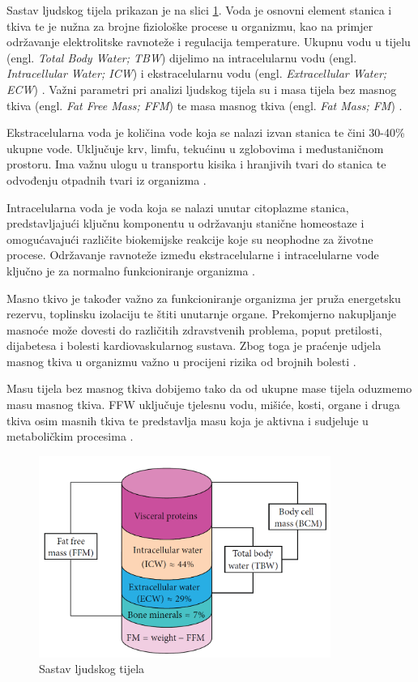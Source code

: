 \documentclass[../diplomski_rad.tex]{subfiles}
\begin{document}
Sastav ljudskog tijela prikazan je na slici \ref{slk:sastav_tijela}.
Voda je osnovni element stanica i tkiva te je nužna za brojne fiziološke procese u organizmu, 
kao na primjer održavanje elektrolitske ravnoteže i regulacija temperature.
Ukupnu vodu u tijelu (engl. \textit{Total Body Water; TBW}) 
dijelimo na intracelularnu vodu (engl. \textit{Intracellular Water; ICW}) i ekstracelularnu vodu (engl. \textit{Extracellular Water; ECW}) \cite{Bera2014}. 
Važni parametri pri analizi ljudskog tijela su i masa tijela bez masnog tkiva (engl. \textit{Fat Free Mass; FFM}) 
te masa masnog tkiva (engl. \textit{Fat Mass; FM}) \cite{Bera2014}.

Ekstracelularna voda je količina vode koja se nalazi izvan stanica te čini 30-40\% ukupne vode. Uključuje krv, limfu, tekućinu u 
zglobovima i međustaničnom prostoru. Ima važnu ulogu u transportu kisika i hranjivih tvari do stanica te odvođenju otpadnih 
tvari iz organizma \cite{Bera2014}.

Intracelularna voda je voda koja se nalazi unutar citoplazme stanica, predstavljajući ključnu 
komponentu u održavanju stanične homeostaze i omogućavajući različite biokemijske reakcije 
koje su neophodne za životne procese.
Održavanje ravnoteže između ekstracelularne i intracelularne vode ključno je za normalno funkcioniranje organizma \cite{Bera2014}.

Masno tkivo je također važno za funkcioniranje organizma jer pruža energetsku rezervu, toplinsku izolaciju te štiti unutarnje organe. 
Prekomjerno nakupljanje masnoće može dovesti do različitih zdravstvenih problema, poput pretilosti, dijabetesa i 
bolesti kardiovaskularnog sustava. 
Zbog toga je praćenje udjela masnog tkiva u organizmu važno u procijeni rizika od brojnih bolesti \cite{Bera2014}.

Masu tijela bez masnog tkiva dobijemo tako da od ukupne mase tijela oduzmemo masu masnog tkiva. 
FFW uključuje tjelesnu vodu, mišiće, kosti, organe i druga tkiva osim masnih tkiva te predstavlja masu koja je aktivna i sudjeluje 
u metaboličkim procesima \cite{Bera2014}.

\begin{figure}[htb]
    \centering
    \includegraphics[width=0.85\textwidth]{Figures/sastav_tijela.png} 
    \caption{Sastav ljudskog tijela \cite{Bera2014}}
    \label{slk:sastav_tijela}
\end{figure}
\end{document}
